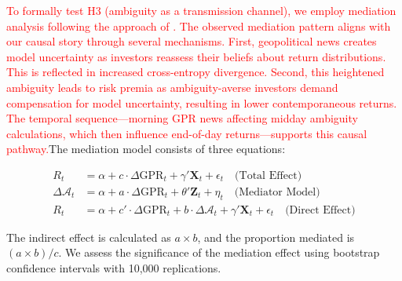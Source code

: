 \documentclass[preprint,12pt,authoryear]{elsarticle}
\begin{document}
\textcolor{red}{To formally test H3 (ambiguity as a transmission channel), we employ mediation analysis following the approach of \citet{Baron1986Moderator}. The observed mediation pattern aligns with our causal story through several mechanisms. First, geopolitical news creates model uncertainty as investors reassess their beliefs about return distributions. This is reflected in increased cross-entropy divergence. Second, this heightened ambiguity leads to risk premia as ambiguity-averse investors demand compensation for model uncertainty, resulting in lower contemporaneous returns. The temporal sequence---morning GPR news affecting midday ambiguity calculations, which then influence end-of-day returns---supports this causal pathway.}The mediation model consists of three equations:

\begin{align}
R_{t} &= \alpha + c \cdot \Delta \text{GPR}_{t} + \gamma' \mathbf{X}_{t} + \epsilon_{t} \quad \text{(Total Effect)} \\
\Delta \mathcal{A}_{t} &= \alpha + a \cdot \Delta \text{GPR}_{t} + \theta' \mathbf{Z}_{t} + \eta_{t} \quad \text{(Mediator Model)} \\
R_{t} &= \alpha + c' \cdot \Delta \text{GPR}_{t} + b \cdot \Delta \mathcal{A}_{t} + \gamma' \mathbf{X}_{t} + \epsilon_{t} \quad \text{(Direct Effect)}
\end{align}

The indirect effect is calculated as $a \times b$, and the proportion mediated is $(a \times b) / c$. We assess the significance of the mediation effect using bootstrap confidence intervals with 10,000 replications.
\end{document}
